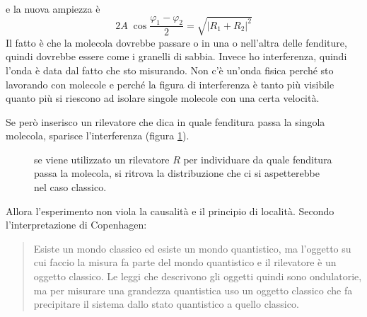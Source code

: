 e la nuova ampiezza è
\[
  2 A \; \cos \frac{\varphi_1 - \varphi_2}{2}
  = \sqrt{\left| R_1 + R_2 \right|^2}
\]
Il fatto è che la molecola dovrebbe passare o in una o nell'altra delle
fenditure, quindi dovrebbe essere come i granelli di sabbia. Invece ho
interferenza, quindi l'onda è data dal fatto che sto misurando. Non c'è un'onda
fisica perché sto lavorando con molecole e perché la figura di interferenza è
tanto più visibile quanto più si riescono ad isolare singole molecole con una
certa velocità.

\bigskip
\noindent
Se però inserisco un rilevatore che dica in quale fenditura passa la singola
molecola, sparisce l'interferenza (figura \ref{rilevatore}).
\begin{figure}
  \centering
  \caption{
    se viene utilizzato un rilevatore \(R\) per individuare da quale fenditura
    passa la molecola, si ritrova la distribuzione che ci si aspetterebbe nel
    caso classico.}
  \label{rilevatore}
\end{figure}
Allora l'esperimento non viola la causalità e il principio di località. Secondo
l'interpretazione di Copenhagen:
\begin{quote}
  Esiste un mondo classico ed esiste un mondo quantistico, ma l'oggetto su cui
  faccio la misura fa parte del mondo quantistico e il rilevatore è un oggetto
  classico. Le leggi che descrivono gli oggetti quindi sono ondulatorie, ma per
  misurare una grandezza quantistica uso un oggetto classico che fa precipitare
  il sistema dallo stato quantistico a quello classico.
\end{quote}